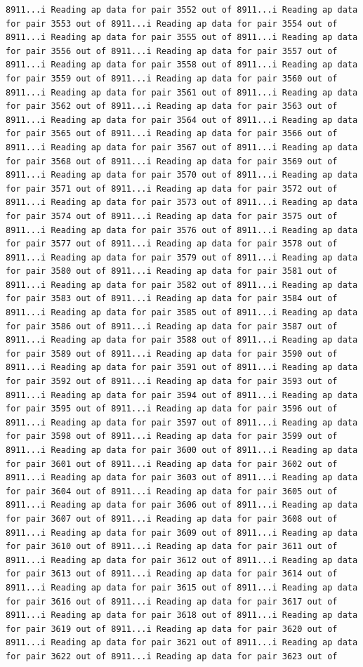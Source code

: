 \documentclass[
]{article}
\begin{document}
\begin{verbatim}
8911...i Reading ap data for pair 3552 out of 8911...i Reading ap data for pair 3553 out of 8911...i Reading ap data for pair 3554 out of 8911...i Reading ap data for pair 3555 out of 8911...i Reading ap data for pair 3556 out of 8911...i Reading ap data for pair 3557 out of 8911...i Reading ap data for pair 3558 out of 8911...i Reading ap data for pair 3559 out of 8911...i Reading ap data for pair 3560 out of 8911...i Reading ap data for pair 3561 out of 8911...i Reading ap data for pair 3562 out of 8911...i Reading ap data for pair 3563 out of 8911...i Reading ap data for pair 3564 out of 8911...i Reading ap data for pair 3565 out of 8911...i Reading ap data for pair 3566 out of 8911...i Reading ap data for pair 3567 out of 8911...i Reading ap data for pair 3568 out of 8911...i Reading ap data for pair 3569 out of 8911...i Reading ap data for pair 3570 out of 8911...i Reading ap data for pair 3571 out of 8911...i Reading ap data for pair 3572 out of 8911...i Reading ap data for pair 3573 out of 8911...i Reading ap data for pair 3574 out of 8911...i Reading ap data for pair 3575 out of 8911...i Reading ap data for pair 3576 out of 8911...i Reading ap data for pair 3577 out of 8911...i Reading ap data for pair 3578 out of 8911...i Reading ap data for pair 3579 out of 8911...i Reading ap data for pair 3580 out of 8911...i Reading ap data for pair 3581 out of 8911...i Reading ap data for pair 3582 out of 8911...i Reading ap data for pair 3583 out of 8911...i Reading ap data for pair 3584 out of 8911...i Reading ap data for pair 3585 out of 8911...i Reading ap data for pair 3586 out of 8911...i Reading ap data for pair 3587 out of 8911...i Reading ap data for pair 3588 out of 8911...i Reading ap data for pair 3589 out of 8911...i Reading ap data for pair 3590 out of 8911...i Reading ap data for pair 3591 out of 8911...i Reading ap data for pair 3592 out of 8911...i Reading ap data for pair 3593 out of 8911...i Reading ap data for pair 3594 out of 8911...i Reading ap data for pair 3595 out of 8911...i Reading ap data for pair 3596 out of 8911...i Reading ap data for pair 3597 out of 8911...i Reading ap data for pair 3598 out of 8911...i Reading ap data for pair 3599 out of 8911...i Reading ap data for pair 3600 out of 8911...i Reading ap data for pair 3601 out of 8911...i Reading ap data for pair 3602 out of 8911...i Reading ap data for pair 3603 out of 8911...i Reading ap data for pair 3604 out of 8911...i Reading ap data for pair 3605 out of 8911...i Reading ap data for pair 3606 out of 8911...i Reading ap data for pair 3607 out of 8911...i Reading ap data for pair 3608 out of 8911...i Reading ap data for pair 3609 out of 8911...i Reading ap data for pair 3610 out of 8911...i Reading ap data for pair 3611 out of 8911...i Reading ap data for pair 3612 out of 8911...i Reading ap data for pair 3613 out of 8911...i Reading ap data for pair 3614 out of 8911...i Reading ap data for pair 3615 out of 8911...i Reading ap data for pair 3616 out of 8911...i Reading ap data for pair 3617 out of 8911...i Reading ap data for pair 3618 out of 8911...i Reading ap data for pair 3619 out of 8911...i Reading ap data for pair 3620 out of 8911...i Reading ap data for pair 3621 out of 8911...i Reading ap data for pair 3622 out of 8911...i Reading ap data for pair 3623 out of 
\end{verbatim}
\end{document}
